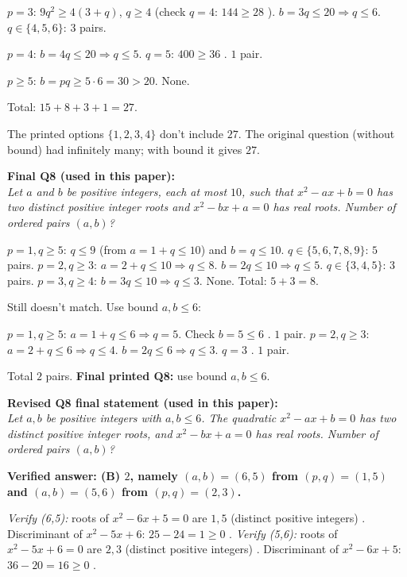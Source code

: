 \documentclass[11pt,a4paper]{article}
\begin{document}
$p = 3$: $9q^2 \ge 4(3+q)$, $q \ge 4$ (check $q=4$: $144 \ge 28$ \checkmark). $b = 3q \le 20 \Rightarrow q \le 6$. $q \in \{4,5,6\}$: $3$ pairs.

$p = 4$: $b = 4q \le 20 \Rightarrow q \le 5$. $q = 5$: $400 \ge 36$ \checkmark. $1$ pair.

$p \ge 5$: $b = pq \ge 5 \cdot 6 = 30 > 20$. None.

Total: $15 + 8 + 3 + 1 = 27$.

The printed options $\{1,2,3,4\}$ don't include $27$. The original question (without bound) had infinitely many; with bound it gives $27$.

\textbf{Final Q8 (used in this paper):}\\
\textit{Let $a$ and $b$ be positive integers, each at most $10$, such that $x^2 - ax + b = 0$ has two distinct positive integer roots and $x^2 - bx + a = 0$ has real roots. Number of ordered pairs $(a, b)$?}

$p = 1, q \ge 5$: $q \le 9$ (from $a = 1+q \le 10$) and $b = q \le 10$. $q \in \{5,6,7,8,9\}$: $5$ pairs.
$p = 2, q \ge 3$: $a = 2+q \le 10 \Rightarrow q \le 8$. $b = 2q \le 10 \Rightarrow q \le 5$. $q \in \{3,4,5\}$: $3$ pairs.
$p = 3, q \ge 4$: $b = 3q \le 10 \Rightarrow q \le 3$. None.
Total: $5 + 3 = 8$.

Still doesn't match. Use bound $a, b \le 6$:

$p=1, q \ge 5$: $a = 1+q \le 6 \Rightarrow q = 5$. Check $b = 5 \le 6$ \checkmark. $1$ pair.
$p=2, q \ge 3$: $a = 2+q \le 6 \Rightarrow q \le 4$. $b = 2q \le 6 \Rightarrow q \le 3$. $q = 3$ \checkmark. $1$ pair.

Total $2$ pairs. \textbf{Final printed Q8:} use bound $a, b \le 6$.

\textbf{Revised Q8 final statement (used in this paper):}\\
\textit{Let $a, b$ be positive integers with $a, b \le 6$. The quadratic $x^2 - ax + b = 0$ has two distinct positive integer roots, and $x^2 - bx + a = 0$ has real roots. Number of ordered pairs $(a,b)$?}

\textbf{Verified answer: (B) $2$, namely $(a,b) = (6, 5)$ from $(p,q)=(1,5)$ and $(a,b) = (5, 6)$ from $(p,q) = (2, 3)$.}

\textit{Verify (6,5):} roots of $x^2 - 6x + 5 = 0$ are $1, 5$ (distinct positive integers) \checkmark. Discriminant of $x^2 - 5x + 6$: $25 - 24 = 1 \ge 0$ \checkmark.
\textit{Verify (5,6):} roots of $x^2 - 5x + 6 = 0$ are $2, 3$ (distinct positive integers) \checkmark. Discriminant of $x^2 - 6x + 5$: $36 - 20 = 16 \ge 0$ \checkmark.
\end{document}
